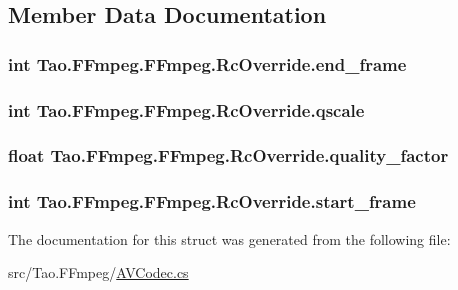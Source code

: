 \subsection{Member Data Documentation}
\hypertarget{struct_tao_1_1_f_fmpeg_1_1_f_fmpeg_1_1_rc_override_a0250030ea6c42803b9d68776d444b181}{
\subsubsection[{end\_\-frame}]{\setlength{\rightskip}{0pt plus 5cm}int {\bf Tao.FFmpeg.FFmpeg.RcOverride.end\_\-frame}}}
\label{struct_tao_1_1_f_fmpeg_1_1_f_fmpeg_1_1_rc_override_a0250030ea6c42803b9d68776d444b181}
\hypertarget{struct_tao_1_1_f_fmpeg_1_1_f_fmpeg_1_1_rc_override_ac8f71b2b29a8fd62eef55476c3010c02}{
\subsubsection[{qscale}]{\setlength{\rightskip}{0pt plus 5cm}int {\bf Tao.FFmpeg.FFmpeg.RcOverride.qscale}}}
\label{struct_tao_1_1_f_fmpeg_1_1_f_fmpeg_1_1_rc_override_ac8f71b2b29a8fd62eef55476c3010c02}
\hypertarget{struct_tao_1_1_f_fmpeg_1_1_f_fmpeg_1_1_rc_override_a7fa5205113564e69f82aaf10ebb01a77}{
\subsubsection[{quality\_\-factor}]{\setlength{\rightskip}{0pt plus 5cm}float {\bf Tao.FFmpeg.FFmpeg.RcOverride.quality\_\-factor}}}
\label{struct_tao_1_1_f_fmpeg_1_1_f_fmpeg_1_1_rc_override_a7fa5205113564e69f82aaf10ebb01a77}
\hypertarget{struct_tao_1_1_f_fmpeg_1_1_f_fmpeg_1_1_rc_override_a06796e4c21f178eb521f776eb3a15102}{
\subsubsection[{start\_\-frame}]{\setlength{\rightskip}{0pt plus 5cm}int {\bf Tao.FFmpeg.FFmpeg.RcOverride.start\_\-frame}}}
\label{struct_tao_1_1_f_fmpeg_1_1_f_fmpeg_1_1_rc_override_a06796e4c21f178eb521f776eb3a15102}


The documentation for this struct was generated from the following file:\begin{DoxyCompactItemize}
\item 
src/Tao.FFmpeg/\hyperlink{_a_v_codec_8cs}{AVCodec.cs}\end{DoxyCompactItemize}
